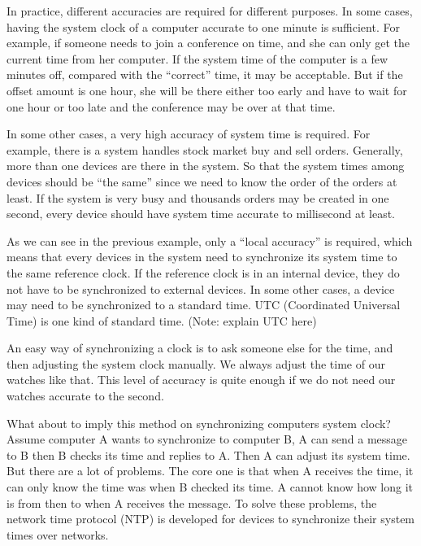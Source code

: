 In practice, different accuracies are required for different purposes. 
In some cases, having the system clock of a computer accurate to one
minute is sufficient. For example, if someone needs to join a conference on time,
and she can only get the current time from her computer. If the system time
of the computer is a few minutes off, compared with the ``correct'' time, it
may be acceptable. But if the offset amount is one hour, she will be there
either too early and have to wait for one hour or too late and the conference
may be over at that
time.

In some other cases, a very high accuracy of system time is required. For
example, there is a system handles stock market buy and sell orders. Generally,
more than one devices are there in the system. So that the system times among
devices should be ``the same'' since we need to know the order of the orders at
least. If the system is very busy and thousands orders may be created in one
second, every device should have system time accurate to millisecond at least.

As we can see in the previous example, only a ``local accuracy'' is required,
which means that every devices in the system need to synchronize its system
time to the same reference clock. If the reference clock is in an internal
device, they do not have to be synchronized to external devices. In some other
cases, a device may need to be synchronized to a standard time. 
UTC (Coordinated Universal Time) is one kind of standard time. 
(Note: explain UTC here)

An easy way of synchronizing a clock is to ask someone else for the time, and
then adjusting the system clock manually. We always adjust the time of our
watches like that. This level of  accuracy is quite enough if we do not need
our watches accurate to the second. 

What about to imply this method on synchronizing computers system clock? Assume
computer A wants to synchronize to computer B, A can send a message to B then B
checks its time and replies to A\null. Then A can adjust its system time.  
But there are a lot of problems.  The core one is that when A receives
the time, it can only know the time was when B checked its time. A cannot know
how long it is from then to when A receives the message. To solve these
problems, the network time protocol (NTP) is developed for devices to
synchronize their system times over networks. 

